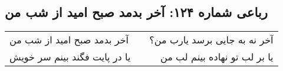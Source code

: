 \begin{center}
\section*{رباعی شماره ۱۲۴: آخر بدمد صبح امید از شب من}
\label{sec:124}
\begin{longtable}{l p{0.5cm} r}
آخر بدمد صبح امید از شب من
&&
آخر نه به جایی برسد یارب من؟
\\
یا در پایت فگند بینم سر خویش
&&
یا بر لب تو نهاده بینم لب من
\\
\end{longtable}
\end{center}
